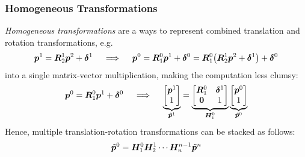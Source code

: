 			\subsubsection{Homogeneous Transformations}
				\emph{Homogeneous transformations} are a ways to represent combined translation and rotation transformations, e.g.
				\begin{equation*}
					\bm{p}^1 = \bm{R}_2^1 \bm{p}^2 + \bm{\delta}^1
					\quad\implies\quad
					\bm{p}^0 = \bm{R}_1^0 \bm{p}^1 + \bm{\delta}^0 = \bm{R}_1^0 \big( \bm{R}_2^1 \bm{p}^2 + \bm{\delta}^1 \big) + \bm{\delta}^0
				\end{equation*}
				into a single matrix-vector multiplication, making the computation less clumsy:
				\begin{equation*}
					\bm{p}^0 = \bm{R}_1^0 \bm{p}^1 + \bm{\delta}^0
					\quad\implies\quad
					\underbrace{\begin{bmatrix}
							\bm{p}^1 \\
							1
						\end{bmatrix}}_{\tilde{\bm{p}}^1}
					=
					\underbrace{\begin{bmatrix}
							\bm{R}_1^0 & \bm{\delta}^1 \\
							\bm{0}     & 1
						\end{bmatrix}}_{\bm{H}_1^0}
					\underbrace{\begin{bmatrix}
							\bm{p}^0 \\
							1
						\end{bmatrix}}_{\tilde{\bm{p}}^0}
				\end{equation*}
				Hence, multiple translation-rotation transformations can be stacked as follows:
				\begin{equation*}
					\tilde{\bm{p}}^0 = \bm{H}_1^0 \bm{H}_2^1 \cdots \bm{H}_n^{n - 1} \tilde{\bm{p}}^n
				\end{equation*}

